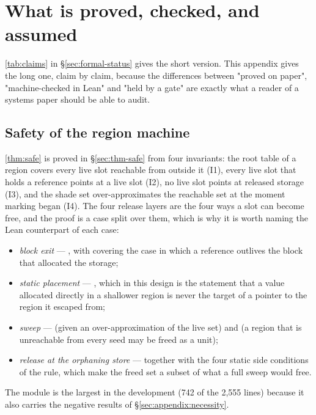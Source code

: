 \section{What is proved, checked, and assumed}
\label{sec:appendix:limits}

\tab\ref{tab:claims} in \S\ref{sec:formal-status} gives the short version.  This appendix gives the
long one, claim by claim, because the differences between "proved on paper", "machine-checked in
Lean" and "held by a gate" are exactly what a reader of a systems paper should be able to audit.

\subsection{Safety of the region machine}
\label{sec:appendix:safe}

\thm\ref{thm:safe} is proved in \S\ref{sec:thm-safe} from four invariants: the root table of a region
covers every live slot reachable from outside it (I1), every live slot that holds a reference points
at a live slot (I2), no live slot points at released storage (I3), and the shade set over-approximates
the reachable set at the moment marking began (I4).  The four release layers are the four ways a slot
can become free, and the proof is a case split over them, which is why it is worth naming the Lean
counterpart of each case:
\begin{itemize}
\item \emph{block exit} — , with 
covering the case in which a reference outlives the block that allocated the storage;
\item \emph{static placement} — , which in this design is the
statement that a value allocated directly in a shallower region is never the target of a pointer to
the region it escaped from;
\item \emph{sweep} —  (given an over-approximation of
the live set) and  (a region that is unreachable from
every seed may be freed as a unit);
\item \emph{release at the orphaning store} —  together
with the four static side conditions of the rule, which make the freed set a subset of what a full
sweep would free.
\end{itemize}
The module  is the largest in the development (742 of the 2,555 lines) because it
also carries the negative results of \S\ref{sec:appendix:necessity}.

